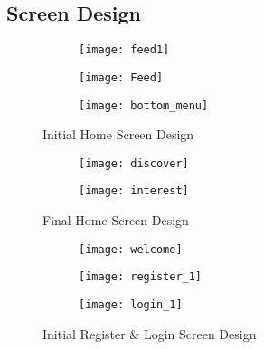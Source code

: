 \appendix
\renewcommand{\thesection}{\Alph{section}}
\begin{appendices}
	\section{Screen Design}
	\label{screen_design}
	\hfill
	\begin{figure}[h!]
		\centering
		\begin{subfigure}{0.33\textwidth}  	      
			\texttt{[image: feed1]}
		\end{subfigure}%
		\begin{subfigure}{0.30\textwidth}	
			\texttt{[image: Feed]}
			\end{subfigure}
		\begin{subfigure}{0.3\textwidth}	
		\texttt{[image: bottom\_menu]}
	\end{subfigure}
\caption{Initial Home Screen Design}
	\end{figure}
	\FloatBarrier

\begin{figure}[h!]
	\centering
	\begin{subfigure}{0.4\textwidth}
			\texttt{[image: discover]}
	\end{subfigure}
	\begin{subfigure}{0.4\textwidth}
	\texttt{[image: interest]}
\end{subfigure}
\caption{Final Home Screen Design}
\end{figure}


	\hfill
\begin{figure}[h!]
	\centering
	\begin{subfigure}{0.30\textwidth}  	      
		\texttt{[image: welcome]}
	\end{subfigure}%
	\begin{subfigure}{0.30\textwidth}	
		\texttt{[image: register\_1]}
	\end{subfigure}
	\begin{subfigure}{0.2\textheight}	
		\texttt{[image: login\_1]}
	\end{subfigure}
\caption{Initial Register \& Login Screen Design}
\end{figure}


\end{appendices}
